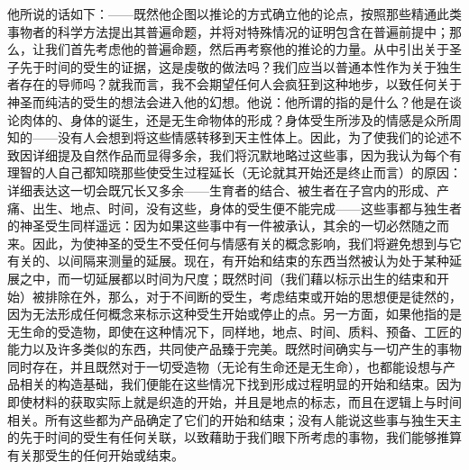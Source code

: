 他所说的话如下：——既然他企图以推论的方式确立他的论点，按照那些精通此类事物者的科学方法提出其普遍命题，并将对特殊情况的证明包含在普遍前提中；那么，让我们首先考虑他的普遍命题，然后再考察他的推论的力量。从中引出关于圣子先于时间的受生的证据，这是虔敬的做法吗？我们应当以普通本性作为关于独生者存在的导师吗？就我而言，我不会期望任何人会疯狂到这种地步，以致任何关于神圣而纯洁的受生的想法会进入他的幻想。他说：他所谓的指的是什么？他是在谈论肉体的、身体的诞生，还是无生命物体的形成？身体受生所涉及的情感是众所周知的——没有人会想到将这些情感转移到天主性体上。因此，为了使我们的论述不致因详细提及自然作品而显得多余，我们将沉默地略过这些事，因为我认为每个有理智的人自己都知晓那些使受生过程延长（无论就其开始还是终止而言）的原因：详细表达这一切会既冗长又多余——生育者的结合、被生者在子宫内的形成、产痛、出生、地点、时间，没有这些，身体的受生便不能完成——这些事都与独生者的神圣受生同样遥远：因为如果这些事中有一件被承认，其余的一切必然随之而来。因此，为使神圣的受生不受任何与情感有关的概念影响，我们将避免想到与它有关的、以间隔来测量的延展。现在，有开始和结束的东西当然被认为处于某种延展之中，而一切延展都以时间为尺度；既然时间（我们藉以标示出生的结束和开始）被排除在外，那么，对于不间断的受生，考虑结束或开始的思想便是徒然的，因为无法形成任何概念来标示这种受生开始或停止的点。另一方面，如果他指的是无生命的受造物，即使在这种情况下，同样地，地点、时间、质料、预备、工匠的能力以及许多类似的东西，共同使产品臻于完美。既然时间确实与一切产生的事物同时存在，并且既然对于一切受造物（无论有生命还是无生命），也都能设想与产品相关的构造基础，我们便能在这些情况下找到形成过程明显的开始和结束。因为即使材料的获取实际上就是织造的开始，并且是地点的标志，而且在逻辑上与时间相关。所有这些都为产品确定了它们的开始和结束；没有人能说这些事与独生天主的先于时间的受生有任何关联，以致藉助于我们眼下所考虑的事物，我们能够推算有关那受生的任何开始或结束。\par

